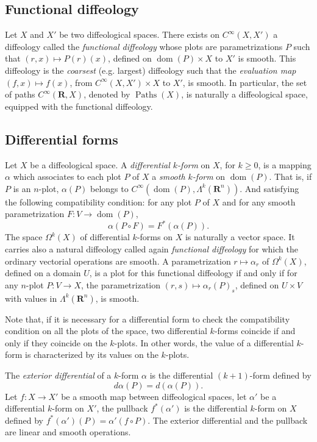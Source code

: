 \documentclass[10pt,reqno,twoside]{amsart}
\newcommand{\RR}{\mathbf{R}}
\DeclareMathOperator{\dom}{dom}
\DeclareMathOperator{\Paths}{Paths}
\newcommand{\Cinfty}{C^\infty}
\theoremstyle{plain}
\theoremstyle{definition}
\newcommand{\article}[1]{\subsection{#1}}
\begin{document}
  \article{Functional diffeology}
  \label{Functional-diffeology}
  Let $X$ and $X'$ be two diffeological spaces.
  There exists on $\Cinfty(X,X')$ a diffeology called the {\em functional diffeology} whose plots are parametrizations $P$ such that $(r,x) \mapsto P (r)(x)$,
  defined on $\dom(P) \times X$ to $X'$ is smooth.
  This diffeology is the {\em coarsest\/} (e.g. largest) diffeology such that the {\em evaluation map} $(f,x) \mapsto f(x)$,
  from $\Cinfty(X,X') \times X$ to $X'$,
  is smooth.
  In particular,
  the set of paths $\Cinfty(\RR,X)$,
  denoted by $\Paths(X)$,
  is naturally a diffeological space,
  equipped with the functional diffeology.
  
  \article{Differential forms}
  \label{Differential-forms}
  Let $X$ be a diffeological space.
  A {\em differential $k$-form} on $X$,
  for $k \geq 0$,
  is a mapping $\alpha$ which associates to each plot $P$ of $X$ a {\em smooth $k$-form} on $\dom(P)$.
  That is,
  if $P$ is an $n$-plot,
  $\alpha(P)$ belongs to $\Cinfty(\dom(P), \Lambda^k(\RR^n))$.
  And satisfying the following compatibility condition:
  for any plot $P$ of $X$ and for any smooth parametrization $F : V \to \dom(P)$,
  $$\alpha(P \circ F) = F^*(\alpha(P)).$$
  The space $\Omega^k(X)$ of differential $k$-forms on $X$ is naturally a vector space.
  It carries also a natural diffeology called again {\em functional diffeology} for which the ordinary vectorial operations are smooth.
  A parametrization $r \mapsto \alpha_r$ of $\Omega^k(X)$,
  defined on a domain $U$,
  is a plot for this functional diffeology if and only if for any $n$-plot $P : V \to X$,
  the parametrization $(r,s) \mapsto \alpha_r(P)_s$,
  defined on $U \times V$ with values in $\Lambda^k(\RR^n)$,
  is smooth.
  
  Note that,
  if it is necessary for a differential form to check the compatibility condition on all the plots of the space,
  two differential $k$-forms coincide if and only if they coincide on the $k$-plots.
  In other words,
  the value of a differential $k$-form is characterized by its values on the $k$-plots.
  
  The {\em exterior differential} of a $k$-form $\alpha$ is the differential $(k+1)$-form defined by
  $$d\alpha(P) = d(\alpha(P)).$$
  Let $f : X \to X'$ be a smooth map between diffeological spaces,
  let $\alpha'$ be a differential $k$-form on $X'$,
  the pullback $f^*(\alpha')$ is the differential $k$-form on $X$ defined by $f^*(\alpha')(P) = \alpha'(f \circ P)$.
  The exterior differential and the pullback are linear and smooth operations.
  
\end{document}
